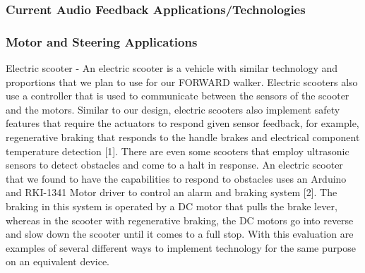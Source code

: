 \subsubsection{Current Audio Feedback Applications/Technologies}
\noindent


\subsubsection{Motor and Steering Applications} 
\noindent Electric scooter - An electric scooter is a vehicle with similar technology and proportions that we plan to use for our FORWARD walker. Electric scooters also use a controller that is used to communicate between the sensors of the scooter and the motors. Similar to our design, electric scooters also implement safety features that require the actuators to respond given sensor feedback, for example, regenerative braking that responds to the handle brakes and electrical component temperature detection [1]. There are even some scooters that employ ultrasonic sensors to detect obstacles and come to a halt in response. An electric scooter that we found to have the capabilities to respond to obstacles uses an Arduino and RKI-1341 Motor driver to control an alarm and braking system [2]. The braking in this system is operated by a DC motor that pulls the brake lever, whereas in the scooter with regenerative braking, the DC motors go into reverse and slow down the scooter until it comes to a full stop. With this evaluation are examples of several different ways to implement technology for the same purpose on an equivalent device. 
